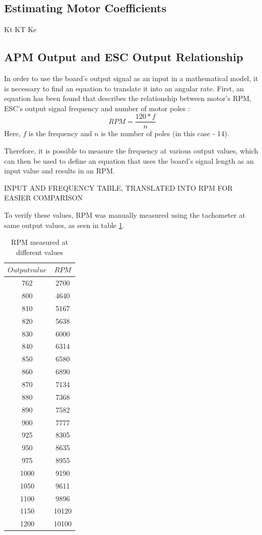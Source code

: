 \subsection{Estimating Motor Coefficients}
Kt
KT
Ke

\subsection{APM Output and ESC Output Relationship}

In order to use the board's output signal as an input in a mathematical model, it is necessary to find an equation to translate it into an angular rate.
First, an equation has been found that describes the relationship between motor's RPM, ESC's output signal frequency and number of motor poles \cite{RPMEq}:
\begin{equation}
\label{voltage1}
	RPM = \frac{120*f}{n}
\end{equation}
Here, $f$ is the frequency and $n$ is the number of poles (in this case - 14).

Therefore, it is possible to measure the frequency at various output values, which can then be used to define an equation that uses the board's signal length as an input value and results in an RPM.

INPUT AND FREQUENCY TABLE, TRANSLATED INTO RPM FOR EASIER COMPARISON

To verify these values, RPM was manually measured using the tachometer at same output values, as seen in table \ref{RPMTable}.

\begin{table}[H]
\centering
\begin{tabular}{|c|c|}
\hline
$Output value$ 	& $RPM$ \\ \hline
762 			& 2700	\\ \hline
800 			& 4640  \\ \hline
810 			& 5167	\\ \hline
820 			& 5638  \\ \hline
830				& 6000 	\\ \hline
840				& 6314	\\ \hline
850 			& 6580	\\ \hline
860 			& 6890	\\ \hline
870 			& 7134	\\ \hline
880 			& 7368	\\ \hline
890 			& 7582	\\ \hline
900 			& 7777	\\ \hline
925 			& 8305	\\ \hline
950 			& 8635	\\ \hline
975 			& 8955	\\ \hline
1000 			& 9190	\\ \hline
1050 			& 9611	\\ \hline
1100 			& 9896	\\ \hline
1150 			& 10120	\\ \hline
1200			& 10100	\\ \hline
\end{tabular}
\caption{RPM measured at different values}
\label{RPMTable}
\end{table}

